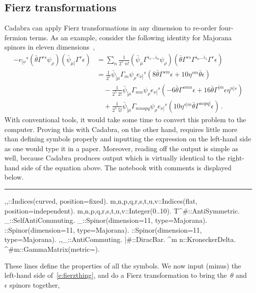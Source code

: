 \documentclass[11pt]{article}
\newenvironment{hanging}
    {\begin{list}{}{\setlength\itemsep{0pt}%
 \setlength\topsep{0pt}%
 \setlength\leftmargin{25pt}%
 \setlength\itemindent{0pt}%
 \setlength\listparindent{\itemindent}}%
     \item[]}
    {\end{list}}
\newcommand{\toprule}{\par\vspace{1ex}\noindent\hspace{25pt}\rule{435pt}{.1pt}}
\newenvironment{cdbin}{\fvset{firstnumber=1}\color[named]{Blue}\Verbatim}{\endVerbatim}
\newenvironment{cdbcom}{\begin{hanging}}{\end{hanging}}
\newcommand{\Cdb}{{Cadabra}\xspace}
\begin{document}
\subsection{Fierz transformations}
\label{s:example3}

\Cdb can apply Fierz transformations in any dimension to re-order
four-fermion terms. As an example, consider the following identity for
Majorana spinors in eleven dimensions~\cite{deWit:1998tk},
\begin{equation}
\begin{aligned}
\label{e:fierzthing}
-e_{[\nu}{}^s (\bar \theta \Gamma^{rs} \psi_\rho)(\bar\psi_{\mu]} \Gamma^r \epsilon) &=
\sum_{n} \frac{1}{2^5\; n!} (\bar\psi_\mu \Gamma^{i_1\ldots i_n} \psi_\rho)
(\bar\theta \Gamma^{rs} \Gamma^{i_n\ldots i_1} \Gamma^{r} \epsilon) \\
&= \frac{1}{2^5} \bar\psi_{[\mu} \Gamma_m \psi_\rho e_{\nu]}{}^s \left( 8 \bar\theta \Gamma^{sm}\epsilon
+ 10 \eta^{sm} \bar\theta\epsilon\right) \\
&\quad - \frac{1}{2^5\; 2!} \bar\psi_{[\mu}\Gamma_{mn} \psi_\rho e_{\nu]}{}^s\left(
-6 \bar\theta\Gamma^{smn} \epsilon + 16\bar\theta \Gamma^{[m} \epsilon \eta^{n]s}\right)\\
&\quad + \frac{1}{2^5\; 5!} \bar\psi_{[\mu}\Gamma_{mnopq} \psi_\rho e_{\nu]}{}^s \left(
10 \eta^{s[m} \bar\theta\Gamma^{nopq]} \epsilon\right) \, .
\end{aligned}
\end{equation}
With conventional tools, it would take some time to convert this
problem to the computer. Proving this with \Cdb, on the other hand,
requires little more than defining symbols properly and inputting the
expression on the left-hand side as one would type it in a
paper. Moreover, reading off the output is simple as well, because \Cdb produces
output which is virtually identical to the right-hand side of the
equation above. The notebook with comments is displayed below.\vfill\eject
\toprule
\begin{cdbin}
{\mu,\nu,\rho}::Indices(curved, position=fixed).
{m,n,p,q,r,s,t,u,v}::Indices(flat, position=independent).
{m,n,p,q,r,s,t,u,v}::Integer(0..10).
T^{#{\mu}}::AntiSymmetric.
\psi_{\mu}::SelfAntiCommuting.
\psi_{\mu}::Spinor(dimension=11, type=Majorana).
\theta::Spinor(dimension=11, type=Majorana).
\epsilon::Spinor(dimension=11, type=Majorana).
{\theta,\epsilon,\psi_{\mu}}::AntiCommuting.
\bar{#}::DiracBar.
\delta^{m n}::KroneckerDelta.
\Gamma^{#{m}}::GammaMatrix(metric=\delta).\end{cdbin}
\begin{cdbcom}
These lines define the properties of all the symbols. We now
input (minus) the left-hand side of~\eqref{e:fierzthing}, and do a Fierz
transformation to bring the~$\theta$ and~$\epsilon$ spinors together,
\end{cdbcom}
\end{document}
